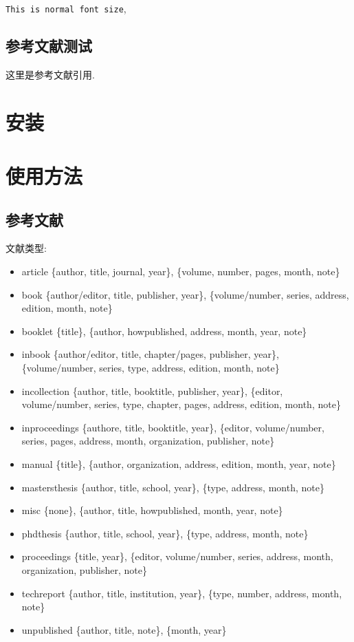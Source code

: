 \documentclass{cugrep}
\begin{document}
{\tt This is normal font size}, 

\section{参考文献测试}

这里是参考文献引用\cite{Zeiler2013}.

\chapter{安装}

\chapter{使用方法}

\section{参考文献}

文献类型:
\begin{itemize}
    \item article\quad{} \{author, title, journal, year\}, \{volume, number, pages, month, note\}
    \item book\quad{} \{author/editor, title, publisher, year\}, \{volume/number, series, address, edition, month, note\}
    \item booklet\quad{} \{title\}, \{author, howpublished, address, month, year, note\}
    \item inbook\quad{} \{author/editor, title, chapter/pages, publisher, year\}, \{volume/number, series, type, address, edition, month, note\}
    \item incollection\quad{} \{author, title, booktitle, publisher, year\}, \{editor, volume/number, series, type, chapter, pages, address, edition, month, note\}
    \item inproceedings\quad{} \{authore, title, booktitle, year\}, \{editor, volume/number, series, pages, address, month, organization, publisher, note\}
    \item manual\quad{} \{title\}, \{author, organization, address, edition, month, year, note\}
    \item mastersthesis\quad{} \{author, title, school, year\}, \{type, address, month, note\}
    \item misc\quad{} \{none\}, \{author, title, howpublished, month, year, note\}
    \item phdthesis\quad{} \{author, title, school, year\}, \{type, address, month, note\}
    \item proceedings\quad{} \{title, year\}, \{editor, volume/number, series, address, month, organization, publisher, note\}
    \item techreport\quad{} \{author, title, institution, year\}, \{type, number, address, month, note\}
    \item unpublished\quad{} \{author, title, note\}, \{month, year\}
\end{itemize}
\end{document}
